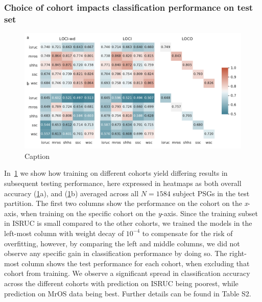\subsubsection{Choice of cohort impacts classification performance on test set}
\begin{figure}
    \centering
    \includegraphics[width=\columnwidth]{figures/paper-ii/figure_03_a-b.pdf}
    \caption[MASSCv2 LOCI and LOCO performance]{Caption}
    \label{fig:paper-ii-figure3}
\end{figure}
In~\cref{fig:paper-ii-figure3} we show how training on different cohorts yield differing results in subsequent testing performance, here expressed in heatmaps as both overall accuracy (\cref{fig:paper-ii-figure3}a), and \cohen (\cref{fig:paper-ii-figure3}b) averaged across all $N=1584$ subject PSGs in the test partition.
The first two columns show the performance on the cohort on the \textit{x}-axis, when training on the specific cohort on the \textit{y}-axis.
Since the training subset in ISRUC is small compared to the other cohorts, we trained the models in the left-most column with weight decay of $10^{-4}$ to compensate for the risk of overfitting, however, by comparing the left and middle columns, we did not observe any specific gain in classification performance by doing so.
The right-most column shows the test performance for each cohort, when excluding that cohort from training.
We observe a significant spread in classification accuracy across the different cohorts with prediction on ISRUC being poorest, while prediction on MrOS data being best.
Further details can be found in Table S2.

